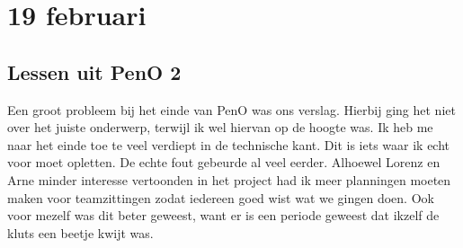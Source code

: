 \section{19 februari}
\subsection{Lessen uit PenO 2}
Een groot probleem bij het einde van PenO was ons verslag. Hierbij ging het niet over het juiste onderwerp, terwijl ik wel hiervan op de hoogte was. Ik heb me naar het einde toe te veel verdiept in de technische kant. Dit is iets waar ik echt voor moet opletten. De echte fout gebeurde al veel eerder. Alhoewel Lorenz en Arne minder interesse vertoonden in het project had ik meer planningen moeten maken voor teamzittingen zodat iedereen goed wist wat we gingen doen. Ook voor mezelf was dit beter geweest, want er is een periode geweest dat ikzelf de kluts een beetje kwijt was. 
